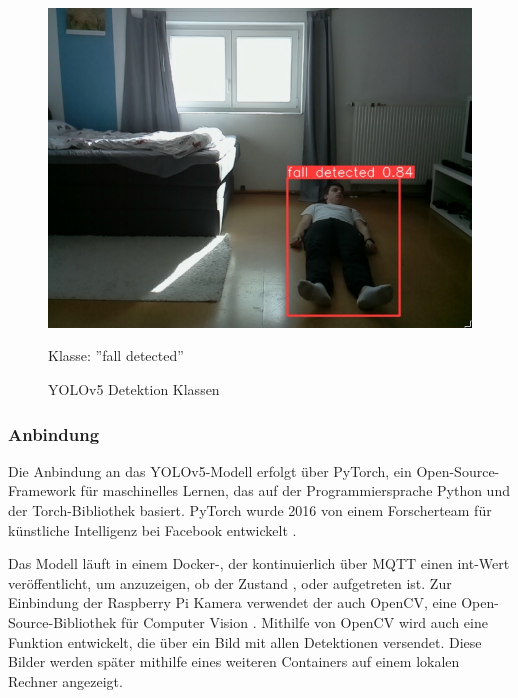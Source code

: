\begin{figure}[H]
\begin{minipage}[b]{0.3\textwidth}
		\includegraphics[width=\textwidth]{images/fallen.png}
		\caption*{Klasse: ''fall detected''}
	\end{minipage}
	\caption{YOLOv5 Detektion Klassen}
	\label{fig:yolo_classes}
\end{figure}



\subsubsection{Anbindung}
Die Anbindung an das YOLOv5-Modell erfolgt über PyTorch, ein Open-Source-Framework für maschinelles Lernen, das auf der Programmiersprache Python und der Torch-Bibliothek basiert. PyTorch wurde 2016 von einem Forscherteam für künstliche Intelligenz bei Facebook entwickelt \cite{noauthor_pytorch_nodate}.

Das Modell läuft in einem Docker-, der kontinuierlich über MQTT einen int-Wert veröffentlicht, um anzuzeigen, ob der Zustand  ,    oder   aufgetreten ist. Zur Einbindung der Raspberry Pi Kamera verwendet der  auch OpenCV, eine Open-Source-Bibliothek für Computer Vision \cite{OpenCV}. Mithilfe von OpenCV wird auch eine Funktion entwickelt, die über  ein Bild mit allen Detektionen versendet. Diese Bilder werden später mithilfe eines weiteren  Containers auf einem lokalen Rechner angezeigt.



